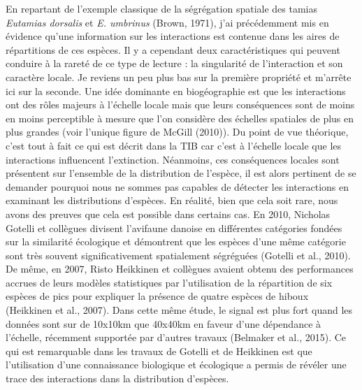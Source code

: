 En repartant de l'exemple classique de la ségrégation spatiale des
tamias \emph{Eutamias dorsalis} et \emph{E. umbrinus} (Brown, 1971),
j'ai précédemment mis en évidence qu'une information sur les
interactions est contenue dans les aires de répartitions de ces espèces.
Il y a cependant deux caractéristiques qui peuvent conduire à la rareté
de ce type de lecture : la singularité de l'interaction et son caractère
locale. Je reviens un peu plus bas sur la première propriété et m'arrête
ici sur la seconde. Une idée dominante en biogéographie est que les
interactions ont des rôles majeurs à l'échelle locale mais que leurs
conséquences sont de moins en moins perceptible à mesure que l'on
considère des échelles spatiales de plus en plus grandes (voir l'unique
figure de McGill (2010)). Du point de vue théorique, c'est tout à fait
ce qui est décrit dans la TIB car c'est à l'échelle locale que les
interactions influencent l'extinction. Néanmoins, ces conséquences
locales sont présentent sur l'ensemble de la distribution de l'espèce,
il est alors pertinent de se demander pourquoi nous ne sommes pas
capables de détecter les interactions en examinant les distributions
d'espèces. En réalité, bien que cela soit rare, nous avons des preuves
que cela est possible dans certains cas. En 2010, Nicholas Gotelli et
collègues divisent l'avifaune danoise en différentes catégories fondées
sur la similarité écologique et démontrent que les espèces d'une même
catégorie sont très souvent significativement spatialement ségréguées
(Gotelli et al., 2010). De même, en 2007, Risto Heikkinen et collègues
avaient obtenu des performances accrues de leurs modèles statistiques
par l'utilisation de la répartition de six espèces de pics pour
expliquer la présence de quatre espèces de hiboux (Heikkinen et al.,
2007). Dans cette même étude, le signal est plus fort quand les données
sont sur de 10x10km que 40x40km en faveur d'une dépendance à l'échelle,
récemment supportée par d'autres travaux (Belmaker et al., 2015). Ce qui
est remarquable dans les travaux de Gotelli et de Heikkinen est que
l'utilisation d'une connaissance biologique et écologique a permis de
révéler une trace des interactions dans la distribution d'espèces.

